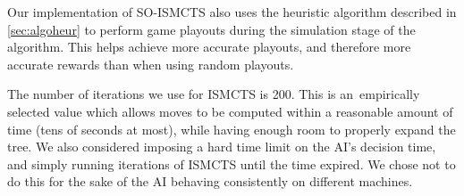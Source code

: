 Our implementation of SO-ISMCTS also uses the heuristic algorithm
described in \autoref{sec:algoheur} to perform
game playouts during the simulation stage of the algorithm. This helps
achieve more accurate playouts, and therefore more accurate rewards
than when using random playouts.

The number of iterations we use for ISMCTS is 200. This is an~empirically
selected value which allows moves to be computed within a reasonable amount of time
(tens of seconds at most), while having enough room to properly expand
the tree. We also considered imposing a hard time limit on the AI's decision time,
and simply running iterations of ISMCTS until the time expired. We chose not to
do this for the sake of the AI behaving consistently on different machines.
